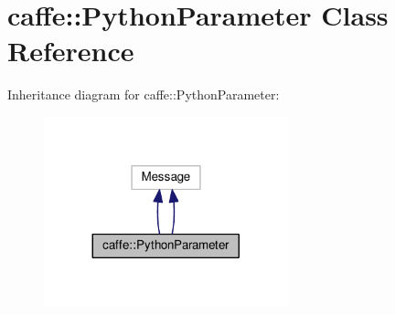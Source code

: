 \hypertarget{classcaffe_1_1_python_parameter}{}\section{caffe\+:\+:Python\+Parameter Class Reference}
\label{classcaffe_1_1_python_parameter}


Inheritance diagram for caffe\+:\+:Python\+Parameter\+:
\nopagebreak
\begin{figure}[H]
\begin{center}
\leavevmode
\includegraphics[width=200pt]{classcaffe_1_1_python_parameter__inherit__graph}
\end{center}
\end{figure}
